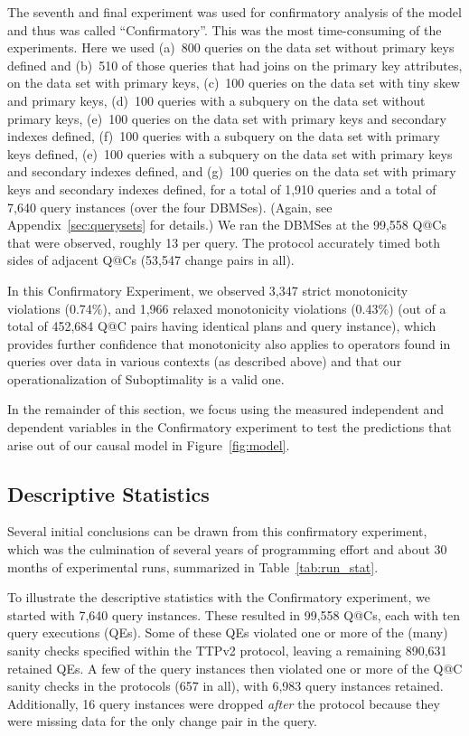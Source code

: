 \documentclass[prodmode,acmtods]{acmsmall}
\makeatletter
\def\QatC{Q{@}C}
\makeatother
\begin{document}
The seventh and final experiment was used for confirmatory analysis of the model and thus was
called ``Confirmatory''. This was the most time-consuming of
the experiments. Here we
used (a)~800 queries on the data set without primary keys defined and (b)~510 of
those queries that had joins on the primary key attributes, on the data set
with primary keys, 
(c)~100 queries on the data set with tiny skew and primary keys,  
(d)~100 queries with a subquery on the data set without primary keys,  
(e)~100 queries on the data set with primary keys and secondary indexes defined, 
(f)~100 queries with a subquery on the data set with primary keys defined,  
(e)~100 queries with a subquery on the data set with primary keys and secondary indexes defined, and 
(g)~100 queries on the data set with primary keys and secondary indexes defined, 
for a total of 1,910 queries and a total of 7,640 query instances (over the
four \hbox{DBMSes}). (Again, see Appendix~\ref{sec:querysets} for details.)
We ran the \hbox{DBMSes} at the 99,558 {\QatC}s that were observed,
roughly 13 per query. The protocol accurately timed
both sides of adjacent {\QatC}s (53,547 change pairs in all).

In this Confirmatory Experiment, we observed 3,347 strict monotonicity
violations (0.74\%), and 1,966 relaxed monotonicity violations (0.43\%) (out
of a total of 452,684 Q@C pairs having identical plans and query instance), which provides
further confidence that monotonicity also applies to operators found in
queries over data in various contexts (as described above) and that our
operationalization of Suboptimality is a valid one.

In the remainder of this section, we focus using the measured independent
and dependent variables in the Confirmatory experiment
to test the predictions that arise out of our causal model in Figure~\ref{fig:model}.

\subsection{Descriptive Statistics}
Several initial conclusions can be drawn from this confirmatory experiment, which was the
culmination of several years of programming effort and about 30 months of
experimental runs, summarized in Table~\ref{tab:run_stat}. 

To illustrate the descriptive statistics with the Confirmatory
experiment, we started with 7,640 query instances. These
resulted in 99,558 Q@Cs, each with ten query executions (QEs). Some of these
QEs violated one or more of the (many) sanity checks specified within the
TTPv2 protocol, leaving a remaining 890,631
retained QEs. A few of the query instances then violated one or more of the
Q@C sanity checks in the protocols (657 in all), with 6,983 query instances retained. Additionally, 16 query instances were dropped {\em after} the
protocol because they were missing data for the only change pair in the
query.
\end{document}
